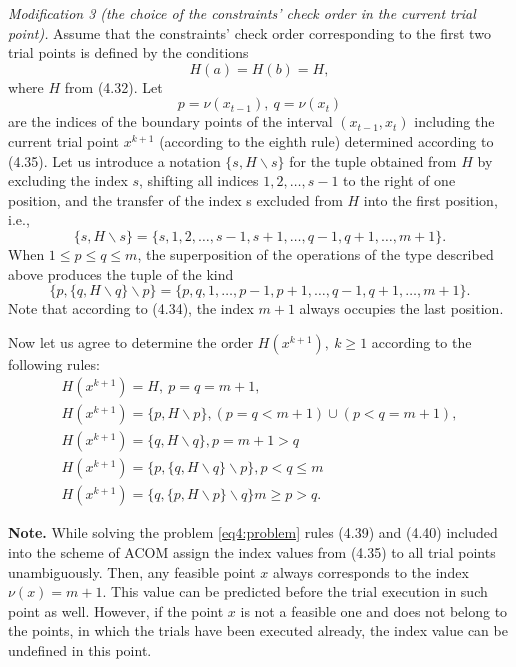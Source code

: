 \documentclass[graybox]{svmult}
\begin{document}
\emph{Modification 3 (the choice of the constraints’ check order in the current trial point).} Assume that the constraints’ check order corresponding to the first two trial points is defined by
the conditions
\begin{equation}
  H(a)=H(b)=H,
\end{equation}
where $H$ from (4.32). Let
\begin{displaymath}
  p=\nu(x_{t-1}),\: q=\nu(x_t)
\end{displaymath}
are the indices of the boundary points of the interval $(x_{t-1},x_t)$ including the current trial point $x^{k+1}$ (according to the eighth rule) determined according to (4.35). Let us introduce a notation $\{s,H\backslash s\}$ for the tuple obtained from $H$ by excluding the index $s$, shifting all indices $1,2,\dots,s-1$ to the right of one position, and the transfer of the index s excluded from $H$ into the first position, i.e.,
\begin{displaymath}
  \{s,H\backslash s\}=\{s,1,2,\dots,s-1,s+1,\dots,q-1,q+1,\dots,m+1\}.
\end{displaymath}
When $1\le p\le q\le m$, the superposition of the operations of the type described above produces the tuple of the kind
\begin{displaymath}
  \{p,\{q,H\backslash q\}\backslash p\}=\{p,q,1,\dots,p-1,p+1,\dots,q-1,q+1,\dots,m+1\}.
\end{displaymath}
Note that according to (4.34), the index $m+1$ always occupies the last position.

Now let us agree to determine the order $H(x^{k+1}),\: k\ge 1$ according to the following rules:
\begin{gather}
 H(x^{k+1})=H,\: p=q=m+1, \nonumber \\
 H(x^{k+1})=\{p,H\backslash p\}, (p=q<m+1)\cup(p<q=m+1), \nonumber \\
 H(x^{k+1})=\{q,H\backslash q\}, p=m+1>q\\
 H(x^{k+1})=\{p, \{q,H\backslash q\}\backslash p\}, p<q\le m \nonumber \\
 H(x^{k+1})=\{q, \{p,H\backslash p\}\backslash q\} m\ge p>q. \nonumber
\end{gather}

\textbf{Note.} While solving the problem \eqref{eq4:problem} rules (4.39) and (4.40) included into the scheme of ACOM assign the index values from (4.35) to all trial points unambiguously. Then, any feasible point $x$ always corresponds to the index $\nu(x)=m+1$. This value can be predicted before the trial execution in such point as well. However, if the point $x$ is not a feasible one and does not belong to the points, in which the trials have been executed already, the index value can be undefined in this point.
\end{document}
